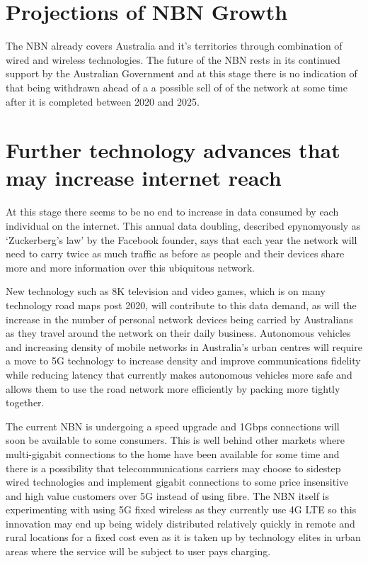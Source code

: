 \section{Projections of NBN Growth}
The NBN already covers Australia and it's territories through combination of wired and wireless technologies. The future of the NBN rests in its continued support by the Australian Government and at this stage there is no indication of that being withdrawn ahead of a a possible sell of of the network at some time after it is completed between 2020 and 2025.

\section{Further technology advances that may increase internet reach}
At this stage there seems to be no end to increase in data consumed by each individual on the internet. This annual data doubling, described epynomyously as `Zuckerberg's law' by the Facebook founder, says that each year the network will need to carry twice as much traffic as before as people and their devices share more and more information over this ubiquitous network.

New technology such as 8K television and video games, which is on many technology road maps post 2020\cite{RefWorks:445}, will contribute to this data demand, as will the increase in the number of personal network devices being carried by Australians as they travel around the network on their daily business. Autonomous vehicles and increasing density of mobile networks in Australia's urban centres will require a move to 5G technology to increase density and improve communications fidelity while reducing latency that currently makes autonomous vehicles more safe and allows them to use the road network more efficiently by packing more tightly together\cite[p19]{RefWorks:445}.

The current NBN is undergoing a speed upgrade and 1Gbps connections will soon be available to some consumers. This is well behind other markets where multi-gigabit connections to the home have been available for some time and there is a possibility that telecommunications carriers may choose to sidestep wired technologies and implement gigabit connections to some price insensitive and high value customers over 5G instead of using fibre. The NBN itself is experimenting with using 5G fixed wireless\cite[p12]{RefWorks:444} as they currently use 4G LTE so this innovation may end up being widely distributed relatively quickly in remote and rural locations for a fixed cost even as it is taken up by technology elites in urban areas where the service will be subject to user pays charging.


